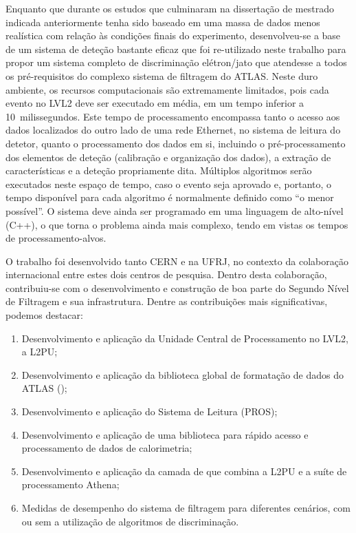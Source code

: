 Enquanto que durante os estudos que culminaram na dissertação de mestrado
indicada anteriormente tenha sido baseado em uma massa de dados menos
realística com relação às condições finais do experimento, desenvolveu-se a
base de um sistema de deteção bastante eficaz que foi re-utilizado neste
trabalho para propor um sistema completo de discriminação elétron/jato que
atendesse a todos os pré-requisitos do complexo sistema de filtragem do
ATLAS. Neste duro ambiente, os recursos computacionais são extremamente
limitados, pois cada evento no LVL2 deve ser executado em média, em um tempo
inferior a 10~milissegundos. Este tempo de processamento encompassa tanto o
acesso aos dados localizados do outro lado de uma rede Ethernet, no sistema de
leitura do detetor, quanto o processamento dos dados em si, incluindo o
pré-processamento dos elementos de deteção (calibração e organização dos
dados), a extração de características e a deteção propriamente dita. Múltiplos
algoritmos serão executados neste espaço de tempo, caso o evento seja aprovado
e, portanto, o tempo disponível para cada algoritmo é normalmente definido
como ``o menor possível''. O sistema deve ainda ser programado em uma
linguagem de alto-nível (C++), o que torna o problema ainda mais complexo,
tendo em vistas os tempos de processamento-alvos.

O trabalho foi desenvolvido tanto CERN e na UFRJ, no contexto da colaboração
internacional entre estes dois centros de pesquisa. Dentro desta colaboração,
contribuiu-se com o desenvolvimento e construção de boa parte do Segundo Nível
de Filtragem e sua infrastrutura. Dentre as contribuições mais significativas,
podemos destacar:

\begin{enumerate}
\item Desenvolvimento e aplicação da Unidade Central de Processamento no
LVL2, a L2PU;
\item Desenvolvimento e aplicação da biblioteca global de formatação de dados
do ATLAS ();
\item Desenvolvimento e aplicação do  Sistema de Leitura (PROS);
\item Desenvolvimento e aplicação de uma biblioteca para rápido acesso e
processamento de dados de calorimetria;
\item Desenvolvimento e aplicação da camada de  que combina a
L2PU e a suíte de processamento  Athena;
\item Medidas de desempenho do sistema de filtragem para diferentes cenários,
com ou sem a utilização de algoritmos de discriminação.
\end{enumerate}

